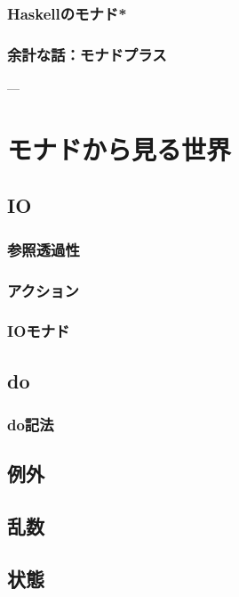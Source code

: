 \documentclass[twocolumn]{jsbook}
\begin{document}
\section{Haskellのモナド*}

\section{余計な話：モナドプラス}


---

\part{モナドから見る世界}

\chapter{IO}

\section{参照透過性}

\section{アクション}

\section{IOモナド}

\chapter{do}

\section{do記法}

\chapter{例外}

\chapter{乱数}

\chapter{状態}
\end{document}
